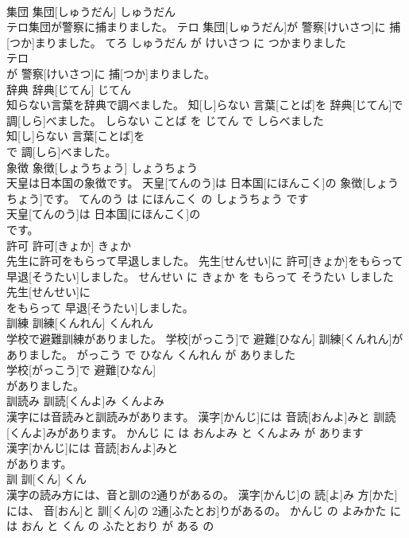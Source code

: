 \documentclass[8pt]{extreport}
\begin{document}
\begin{CJK}{UTF8}{min}
\\	集団	集団[しゅうだん]	しゅうだん	
\\	テロ集団が警察に捕まりました。	テロ 集団[しゅうだん]が 警察[けいさつ]に 捕[つか]まりました。	てろ しゅうだん が けいさつ に つかまりました	
\\	テロ
\\	が 警察[けいさつ]に 捕[つか]まりました。			
\\	辞典	辞典[じてん]	じてん	
\\	知らない言葉を辞典で調べました。	知[し]らない 言葉[ことば]を 辞典[じてん]で 調[しら]べました。	しらない ことば を じてん で しらべました	
\\	知[し]らない 言葉[ことば]を
\\	で 調[しら]べました。			
\\	象徴	象徴[しょうちょう]	しょうちょう	
\\	天皇は日本国の象徴です。	天皇[てんのう]は 日本国[にほんこく]の 象徴[しょうちょう]です。	てんのう は にほんこく の しょうちょう です	
\\	天皇[てんのう]は 日本国[にほんこく]の
\\	です。			
\\	許可	許可[きょか]	きょか	
\\	先生に許可をもらって早退しました。	先生[せんせい]に 許可[きょか]をもらって 早退[そうたい]しました。	せんせい に きょか を もらって そうたい しました	
\\	先生[せんせい]に
\\	をもらって 早退[そうたい]しました。			
\\	訓練	訓練[くんれん]	くんれん	
\\	学校で避難訓練がありました。	学校[がっこう]で 避難[ひなん] 訓練[くんれん]がありました。	がっこう で ひなん くんれん が ありました	
\\	学校[がっこう]で 避難[ひなん]
\\	がありました。			
\\	訓読み	訓読[くんよ]み	くんよみ	
\\	漢字には音読みと訓読みがあります。	漢字[かんじ]には 音読[おんよ]みと 訓読[くんよ]みがあります。	かんじ に は おんよみ と くんよみ が あります	
\\	漢字[かんじ]には 音読[おんよ]みと
\\	があります。			
\\	訓	訓[くん]	くん	
\\	漢字の読み方には、音と訓の2通りがあるの。	漢字[かんじ]の 読[よ]み 方[かた]には、 音[おん]と 訓[くん]の 2通[ふたとお]りがあるの。	かんじ の よみかた に は おん と くん の ふたとおり が ある の	

\end{CJK}
\end{document}
